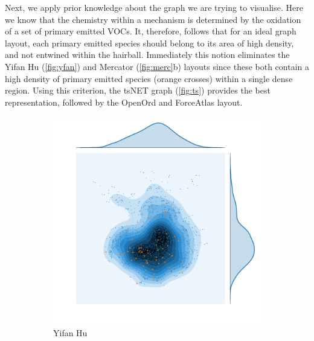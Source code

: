 Next, we apply prior knowledge about the graph we are trying to visualise. Here we know that the chemistry within a mechanism is determined by the oxidation of a set of primary emitted VOCs. It, therefore, follows that for an ideal graph layout, each primary emitted species should belong to its area of high density, and not entwined within the hairball. Immediately this notion eliminates the Yifan Hu (\autoref{fig:yfan}) and Mercator (\autoref{fig:merc}b) layouts since these both contain a high density of primary emitted species (orange crosses) within a single dense region. Using this criterion, the tsNET graph (\autoref{fig:ts}) provides the best representation, followed by the OpenOrd and ForceAtlas layout. 




\begin{figure}[H]
     \centering
    \begin{subfigure}[b]{.49\textwidth}
         \centering \includegraphics[width=\textwidth,angle=90]{figures_c1/layout/yfan_aphh.pdf}
         \caption{Yifan Hu}
         \label{fig:yfan}
     \end{subfigure}
     \begin{subfigure}[b]{.49\textwidth}

\end{subfigure}
\end{figure}
